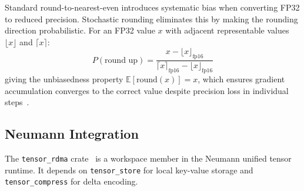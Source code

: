 \documentclass[11pt,letterpaper]{article}
\theoremstyle{definition}
\begin{document}
Standard round-to-nearest-even introduces systematic bias when converting FP32 to reduced precision. Stochastic rounding eliminates this by making the rounding direction probabilistic. For an FP32 value $x$ with adjacent representable values $\lfloor x \rfloor$ and $\lceil x \rceil$:
\begin{equation}
    P(\text{round up}) = \frac{x - \lfloor x \rfloor_{\text{fp16}}}{\lceil x \rceil_{\text{fp16}} - \lfloor x \rfloor_{\text{fp16}}}
\end{equation}
giving the unbiasedness property $\mathbb{E}[\text{round}(x)] = x$, which ensures gradient accumulation converges to the correct value despite precision loss in individual steps~\cite{micikevicius2018mixed}.

\subsection{Neumann Integration}
\label{sec:neumann-integration}

The \texttt{tensor\_rdma} crate~\cite{neumann-repo} is a workspace member in the Neumann unified tensor runtime. It depends on \texttt{tensor\_store} for local key-value storage and \texttt{tensor\_compress} for delta encoding.
\end{document}
